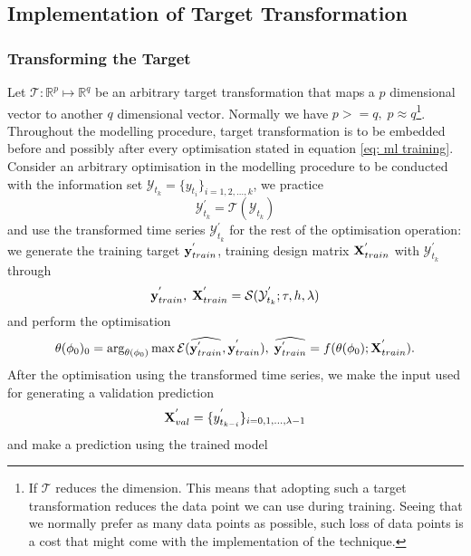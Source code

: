 \subsection{Implementation of Target Transformation}

\subsubsection{Transforming the Target}
Let $\mathcal{T}: \mathbb{R}^p \longmapsto \mathbb{R}^q$ be an arbitrary target transformation that maps a $p$ dimensional vector to another $q$ dimensional vector. Normally we have $p >= q, \; p \approx q$\footnote{If $\mathcal{T}$ reduces the dimension. This means that adopting such a target transformation reduces the data point we can use during training. Seeing that we normally prefer as many data points as possible, such loss of data points is a cost that might come with the implementation of the technique.}. Throughout the modelling procedure, target transformation is to be embedded before and possibly after every optimisation stated in equation \ref{eq: ml training}. Consider an arbitrary optimisation in the modelling procedure to be conducted with the information set $\mathcal{Y}_{t_k} = \{ y_{t_i} \}_{i = 1, 2, \ldots, k}$, we practice
\begin{equation*}
    \mathcal{Y}^{'}_{t_k} = \mathcal{T}(\mathcal{Y}_{t_k})
\end{equation*}
and use the transformed time series $\mathcal{Y}^{'}_{t_k}$ for the rest of the optimisation operation: we generate the training target $\mathbf{y}^{'}_{train}$, training design matrix $\mathbf{X}^{'}_{train}$ with $\mathcal{Y}^{'}_{t_k}$ through
\begin{equation*}
    \mathbf{y}^{'}_{train}, \; \mathbf{X}^{'}_{train} = \mathcal{S}(\mathcal{Y}^{'}_{t_k}; \tau, h, \lambda)
\end{equation*}
and perform the optimisation
\begin{equation*}
    \theta(\phi_0)_0 = \arg_{\theta(\phi_0)} \max \mathcal{E}(\widehat{\mathbf{y}^{'}_{train}}, \mathbf{y}^{'}_{train}), \; \widehat{\mathbf{y}^{'}_{train}} = f(\theta(\phi_0); \mathbf{X}^{'}_{train}).
\end{equation*}
After the optimisation using the transformed time series, we make the input used for generating a validation prediction
\begin{equation*}
    \mathbf{X}^{'}_{val} = \{y^{'}_{t_{k-i}} \}_{i = 0, 1, \ldots, \lambda-1}
\end{equation*}
and make a prediction using the trained model
